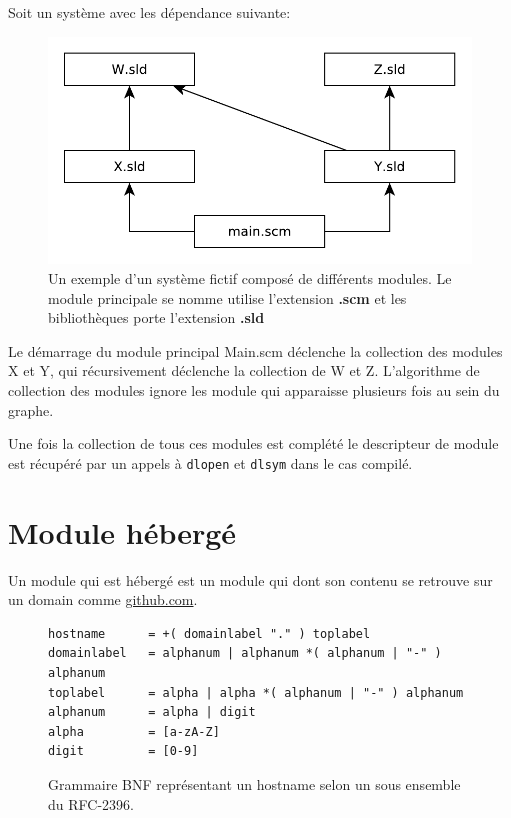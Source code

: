 Soit un système avec les dépendance suivante:
\begin{figure}[ht]
  \includegraphics{figures/system-example}
  \caption{Un exemple d'un système fictif composé de différents modules.
  Le module principale se nomme utilise l'extension \textbf{.scm}
  et les bibliothèques porte l'extension \textbf{.sld}}
\end{figure} %


Le démarrage du module principal Main.scm déclenche la collection des modules X
et Y, qui récursivement déclenche la collection de W et Z. L'algorithme de
collection des modules ignore les module qui apparaisse plusieurs fois au sein
du graphe.

Une fois la collection de tous ces modules est complété le descripteur de
module est récupéré par un appels à \verb|dlopen| et \verb|dlsym| dans le cas
compilé.


\section{Module hébergé}

Un module qui est hébergé est un module qui dont son contenu
se retrouve sur un domain comme \url{github.com}.


\begin{figure}[ht]
\begin{lstlisting}
hostname      = +( domainlabel "." ) toplabel
domainlabel   = alphanum | alphanum *( alphanum | "-" ) alphanum
toplabel      = alpha | alpha *( alphanum | "-" ) alphanum
alphanum      = alpha | digit
alpha         = [a-zA-Z]
digit         = [0-9]
\end{lstlisting}
  \caption{Grammaire BNF représentant un hostname selon un sous
  ensemble du RFC-2396.}
\end{figure}

